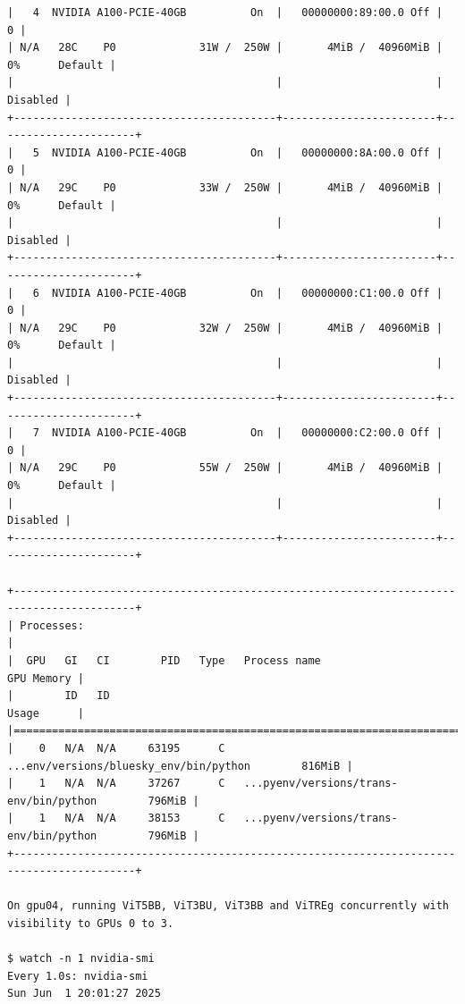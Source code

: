 \begin{verbatim}
|   4  NVIDIA A100-PCIE-40GB          On  |   00000000:89:00.0 Off |                    0 |
| N/A   28C    P0             31W /  250W |       4MiB /  40960MiB |      0%      Default |
|                                         |                        |             Disabled |
+-----------------------------------------+------------------------+----------------------+
|   5  NVIDIA A100-PCIE-40GB          On  |   00000000:8A:00.0 Off |                    0 |
| N/A   29C    P0             33W /  250W |       4MiB /  40960MiB |      0%      Default |
|                                         |                        |             Disabled |
+-----------------------------------------+------------------------+----------------------+
|   6  NVIDIA A100-PCIE-40GB          On  |   00000000:C1:00.0 Off |                    0 |
| N/A   29C    P0             32W /  250W |       4MiB /  40960MiB |      0%      Default |
|                                         |                        |             Disabled |
+-----------------------------------------+------------------------+----------------------+
|   7  NVIDIA A100-PCIE-40GB          On  |   00000000:C2:00.0 Off |                    0 |
| N/A   29C    P0             55W /  250W |       4MiB /  40960MiB |      0%      Default |
|                                         |                        |             Disabled |
+-----------------------------------------+------------------------+----------------------+

+-----------------------------------------------------------------------------------------+
| Processes:                                                                              |
|  GPU   GI   CI        PID   Type   Process name                              GPU Memory |
|        ID   ID                                                               Usage      |
|=========================================================================================|
|    0   N/A  N/A     63195      C   ...env/versions/bluesky_env/bin/python        816MiB |
|    1   N/A  N/A     37267      C   ...pyenv/versions/trans-env/bin/python        796MiB |
|    1   N/A  N/A     38153      C   ...pyenv/versions/trans-env/bin/python        796MiB |
+-----------------------------------------------------------------------------------------+

On gpu04, running ViT5BB, ViT3BU, ViT3BB and ViTREg concurrently with visibility to GPUs 0 to 3.

$ watch -n 1 nvidia-smi
Every 1.0s: nvidia-smi                                                                                                                                                                    Sun Jun  1 20:01:27 2025


\end{verbatim}
